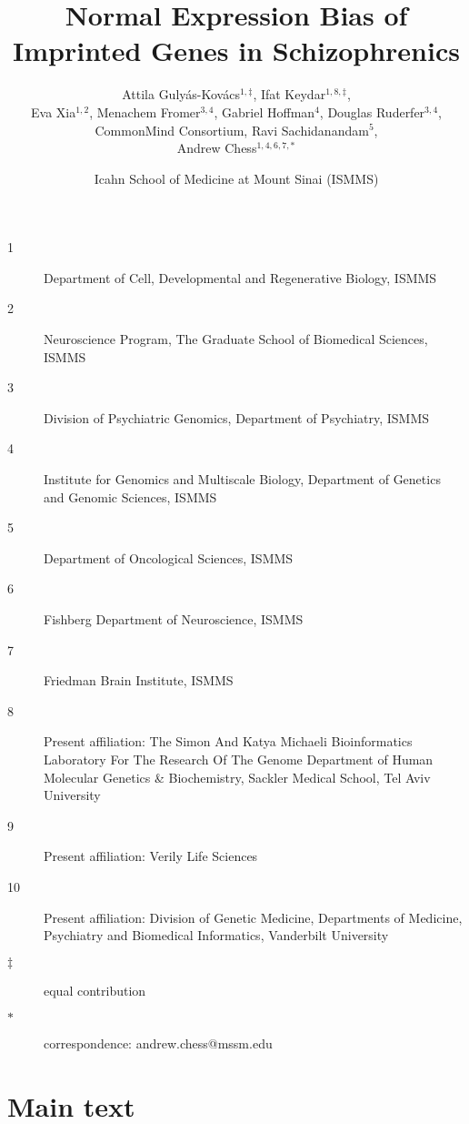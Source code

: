 \documentclass[letterpaper]{article}
\title{Normal Expression Bias of Imprinted Genes in Schizophrenics}
\author{Attila Guly\'{a}s-Kov\'{a}cs\(^{1,\ddagger}\), Ifat Keydar\(^{1,8,\ddagger}\), \\
Eva Xia\(^{1,2}\), Menachem Fromer\(^{3,4}\), Gabriel Hoffman\(^{4}\), Douglas Ruderfer\(^{3,4}\), \\
CommonMind Consortium, Ravi Sachidanandam\(^{5}\), \\
Andrew Chess\(^{1,4,6,7,\ast}\)}
\date{Icahn School of Medicine at Mount Sinai (ISMMS)}
\begin{document}
\maketitle

\begin{description}
\item[1] Department of Cell, Developmental and Regenerative Biology, ISMMS 
\item[2] Neuroscience Program, The Graduate School of Biomedical Sciences, ISMMS 
\item[3] Division of Psychiatric Genomics, Department of Psychiatry, ISMMS 
\item[4] Institute for Genomics and Multiscale Biology, Department of Genetics and Genomic Sciences, ISMMS 
\item[5] Department of Oncological Sciences, ISMMS 
\item[6] Fishberg Department of Neuroscience, ISMMS 
\item[7] Friedman Brain Institute, ISMMS 
\item[8] Present affiliation: The Simon And Katya Michaeli Bioinformatics
Laboratory For The Research Of The Genome Department of Human Molecular
Genetics \& Biochemistry, Sackler Medical School, Tel Aviv University
\item[9] Present affiliation: Verily Life Sciences
\item[10] Present affiliation: Division of Genetic Medicine, Departments of
Medicine, Psychiatry and Biomedical Informatics, Vanderbilt University
\item[\(\ddagger\)] equal contribution 
\item[\(\ast\)] correspondence: andrew.chess@mssm.edu 
\end{description}

\clearpage
\tableofcontents

\clearpage

\section{Main text}
\end{document}
